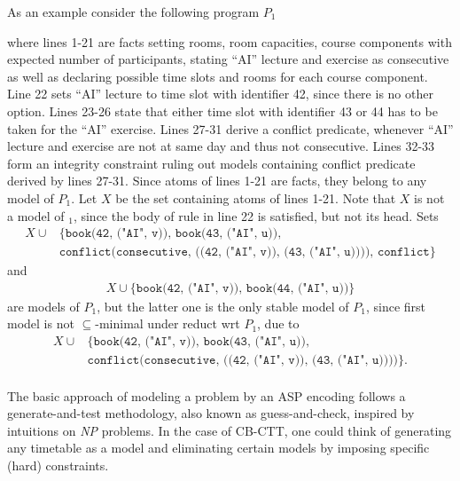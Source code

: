 \documentclass{easychair}
\newcommand{\CBCTT}{CB-CTT}
\newcommand{\ASP}{ASP}
\begin{document}
  As an example consider the following program $P_1$
  
  where lines 1-21 are facts setting rooms, room capacities, course components with expected number of participants, stating ``AI'' lecture and exercise as consecutive as well as declaring possible time slots and rooms for each course component. 
  Line 22 sets ``AI'' lecture to time slot with identifier 42, since there is no other option. 
  Lines 23-26 state that either time slot with identifier 43 or 44 has to be taken for the ``AI'' exercise. 
  Lines 27-31 derive a conflict predicate, whenever ``AI'' lecture and exercise are not at same day and thus not consecutive. 
  Lines 32-33 form an integrity constraint ruling out models containing conflict predicate derived by lines 27-31. 
  Since atoms of lines 1-21 are facts, they belong to any model of $P_1$. 
  Let $X$ be the set containing atoms of lines 1-21. 
  Note that $X$ is not a model of $_1$, since the body of rule in line 22 is satisfied, but not its head. 
  Sets 
  \begin{align*}
    X\cup&\{\texttt{book(42, ("AI", v)), book(43, ("AI", u)),} \\
         &\texttt{conflict(consecutive, ((42, ("AI", v)), (43, ("AI", u)))), conflict}\}
  \end{align*} 
  and 
  \begin{align*}
    X\cup\{\texttt{book(42, ("AI", v)), book(44, ("AI", u))}\}
  \end{align*} 
  are models of $P_1$, but the latter one is the only stable model of $P_1$, since first model is not $\subseteq$-minimal under reduct wrt $P_1$, due to 
  \begin{align*}
    X\cup&\{\texttt{book(42, ("AI", v)), book(43, ("AI", u)),} \\
         &\texttt{conflict(consecutive, ((42, ("AI", v)), (43, ("AI", u))))}\}.
  \end{align*} \\
  The basic approach of modeling a problem by an \ASP{} encoding follows a generate-and-test methodology, also known as guess-and-check, inspired by intuitions on \textit{NP} problems. 
  In the case of \CBCTT{}, one could think of generating any timetable as a model and eliminating certain models by imposing specific (hard) constraints.
\end{document}
